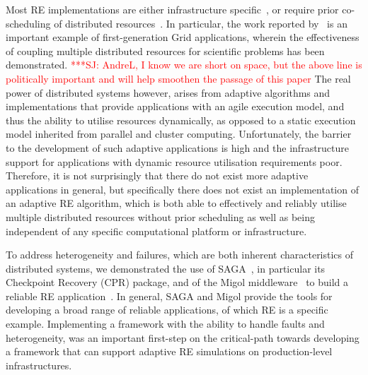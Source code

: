 \documentclass{rspublic}
\newcommand{\jhanote}[1]{ {\textcolor{red} { ***SJ: #1 }}}
\newcommand{\jhanote}[1]{}
\begin{document}
Most RE implementations are either infrastructure
specific~\citep{Woods:2005nx}, or require prior co-scheduling of
distributed resources~\citep{repex_mpig}.  
In particular, the work reported by~\citet{repex_mpig} is an important
example of first-generation Grid applications, wherein the
effectiveness of coupling multiple distributed resources for
scientific problems has been demonstrated.  \jhanote{AndreL, I know we
  are short on space, but the above line is politically important and
  will help smoothen the passage of this paper} The real power of
distributed systems however, arises from adaptive algorithms and
implementations that provide applications with an agile execution
model, and thus the ability to utilise resources dynamically, as
opposed to a static execution model inherited from parallel and
cluster computing.  Unfortunately, the barrier to the development of
such adaptive applications is high and the infrastructure support for
applications with dynamic resource utilisation requirements poor.
Therefore, it is not surprisingly that there do not exist more
adaptive applications in general, but specifically there does not
exist an implementation of an adaptive RE algorithm, which is both
able to effectively and reliably utilise multiple distributed
resources without prior scheduling as well as being independent of any
specific computational platform or infrastructure.
                      
To address heterogeneity and failures, which are both inherent
characteristics of distributed systems, we demonstrated the use of
SAGA~\citep{saga_gfd90}, in particular its Checkpoint Recovery (CPR)
package, and of the Migol middleware~\citep{schnorLuckow08} to build a
reliable RE application~\citep{Luckow:2008la}.
In general, SAGA and Migol provide the tools for developing a broad
range of reliable applications, of which RE is a specific example.
Implementing a framework with the ability to handle faults and
heterogeneity, was an important first-step on the critical-path
towards developing a framework that can support adaptive RE simulations on
production-level infrastructures.
\end{document}
